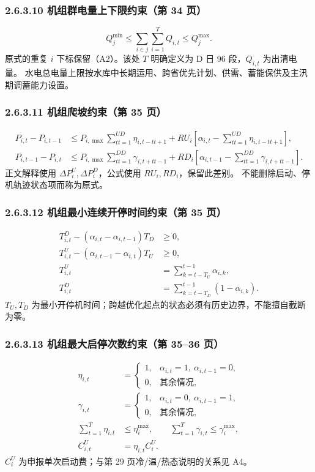 \subsubsection{2.6.3.10 机组群电量上下限约束（第 34 页）}
\begin{equation}
 Q^{\min}_j\le\sum_{i\in j}\sum_{i=1}^{T}Q_{i,t}\le Q^{\max}_j.
\end{equation}
原式的重复 $i$ 下标保留（A2）。该处 $T$ 明确定义为 D 日 96 段，$Q_{i,t}$ 为出清电量。
水电总电量上限按水库中长期运用、跨省优先计划、供需、蓄能保供及主汛期调蓄能力设置。

\subsubsection{2.6.3.11 机组爬坡约束（第 35 页）}
\begin{align}
 P_{i,t}-P_{i,t-1}&\le P_{i,\max}\sum_{tt=1}^{UD}\eta_{i,t-tt+1}
       +RU_i\left[\alpha_{i,t}-\sum_{tt=1}^{UD}\eta_{i,t-tt+1}\right],\\
 P_{i,t-1}-P_{i,t}&\le P_{i,\max}\sum_{tt=1}^{DD}\gamma_{i,t+tt-1}
       +RD_i\left[\alpha_{i,t-1}-\sum_{tt=1}^{DD}\gamma_{i,t+tt-1}\right].
\end{align}
正文解释使用 $\Delta P_i^U,\Delta P_i^D$，公式使用 $RU_i,RD_i$，保留此差别。
不能删除启动、停机轨迹状态项而称为原式。

\subsubsection{2.6.3.12 机组最小连续开停时间约束（第 35 页）}
\begin{align}
 T^D_{i,t}-(\alpha_{i,t}-\alpha_{i,t-1})T_D&\ge0,\\
 T^U_{i,t}-(\alpha_{i,t-1}-\alpha_{i,t})T_U&\ge0,\\
 T^U_{i,t}&=\sum_{k=t-T_U}^{t-1}\alpha_{i,k},\\
 T^D_{i,t}&=\sum_{k=t-T_D}^{t-1}(1-\alpha_{i,k}).
\end{align}
$T_U,T_D$ 为最小开停机时间；跨越优化起点的状态必须有历史边界，不能擅自截断为零。

\subsubsection{2.6.3.13 机组最大启停次数约束（第 35--36 页）}
\begin{align}
 \eta_{i,t}&=\begin{cases}1,&\alpha_{i,t}=1,\ \alpha_{i,t-1}=0,\\0,&\text{其余情况},\end{cases}\\
 \gamma_{i,t}&=\begin{cases}1,&\alpha_{i,t}=0,\ \alpha_{i,t-1}=1,\\0,&\text{其余情况},\end{cases}\\
 \sum_{t=1}^{T}\eta_{i,t}&\le\eta_i^{\max},\qquad
 \sum_{t=1}^{T}\gamma_{i,t}\le\gamma_i^{\max},\\
 C^U_{i,t}&=\eta_{i,t}C_i^U.
\end{align}
$C_i^U$ 为申报单次启动费；与第 29 页冷/温/热态说明的关系见 A4。

